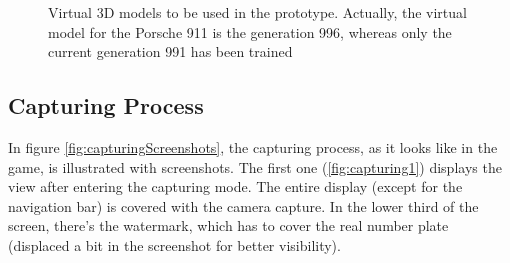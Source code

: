 \begin{figure}[btph]
        \myfloatalign
         \quad
         \quad
         \quad
        \caption[Virtual 3D models to be used in the prototype. Actually, the virtual model for the Porsche 911 is the generation 996, whereas only the newest generation 991 has been trained]{Virtual 3D models to be used in the prototype. Actually, the virtual model for the Porsche 911 is the generation 996, whereas only the current generation 991 has been trained}
\label{fig:virtualModels}
\end{figure}

\subsection{Capturing Process}
In figure \ref{fig:capturingScreenshots}, the capturing process, as it looks like in the game, is illustrated with screenshots. The first one (\ref{fig:capturing1}) displays the view after entering the capturing mode. The entire display (except for the navigation bar) is covered with the camera capture. In the lower third of the screen, there's the watermark, which has to cover the real number plate (displaced a bit in the screenshot for better visibility).

